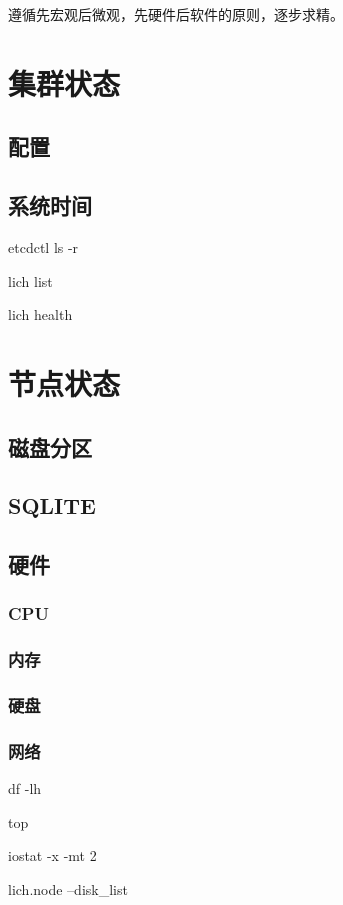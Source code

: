 遵循先宏观后微观，先硬件后软件的原则，逐步求精。

\section{集群状态}

\subsection{配置}

\subsection{系统时间}

\begin{tcolorbox}
etcdctl ls -r

lich list

lich health
\end{tcolorbox}

\section{节点状态}

\subsection{磁盘分区}

\subsection{SQLITE}

\subsection{硬件}

\subsubsection{CPU}
\subsubsection{内存}
\subsubsection{硬盘}
\subsubsection{网络}

\begin{tcolorbox}
df -lh

top

iostat -x -mt 2

lich.node --disk\_list 
\end{tcolorbox}
